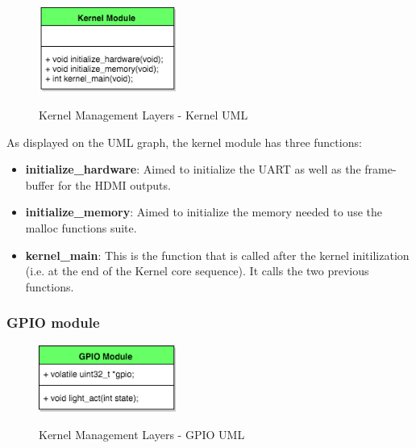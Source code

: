 \begin{figure}[H]
\begin{center}
\includegraphics[width=0.4\textwidth]{includes/figures/chapter5_kernel_management_layer_kernel_UML.png}  \\
\caption{Kernel Management Layers - Kernel UML}
\end{center}
\label{fig:chapter5_kernel_management_layer_kernel_UML}
\end{figure}


As displayed on the UML graph, the kernel module has three functions:
\begin{itemize}
	\item \textbf{initialize\_hardware}: Aimed to initialize the UART as well as the frame-buffer for the HDMI outputs.
	\item \textbf{initialize\_memory}: Aimed to initialize the memory needed to use the malloc functions suite.
	\item \textbf{kernel\_main}: This is the function that is called after the kernel initilization (i.e. at the end of the Kernel core sequence). It calls the two previous functions.
\end{itemize}




\subsubsection{GPIO module}

\begin{figure}[H]
\begin{center}
\includegraphics[width=0.4\textwidth]{includes/figures/chapter5_kernel_management_layer_GPIO_UML.png}  \\
\caption{Kernel Management Layers - GPIO UML}
\end{center}
\label{fig:chapter5_kernel_management_layer_GPIO_UML}
\end{figure}


